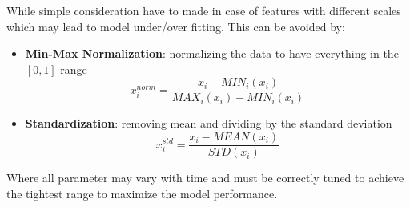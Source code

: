 \documentclass{article}
\begin{document}
        While simple consideration have to made in case of features with different scales which may lead to model under/over fitting. This can be avoided by:
        \begin{itemize}
          \item \textbf{Min-Max Normalization}: normalizing the data to have everything in the $[0,1]$ range
          \begin{equation} 
            x_i^{norm} = \frac{x_i- MIN_i(x_i)}{MAX_i(x_i)-MIN_i(x_i)}
          \end{equation}
          \item \textbf{Standardization}: removing mean and dividing by the standard deviation
          \begin{equation} 
            x_i^{std} = \frac{x_i- MEAN(x_i)}{STD(x_i)}
          \end{equation}
        \end{itemize}
        Where all parameter may vary with time and must be correctly tuned to achieve the tightest range to maximize the model performance. 
\end{document}
